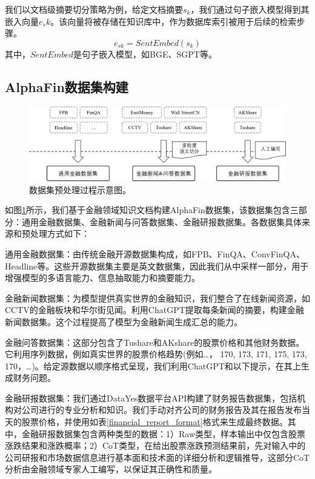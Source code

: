 我们以文档级摘要切分策略为例，给定文档摘要$s_k$，我们通过句子嵌入模型得到其嵌入向量$e_sk$。该向量将被存储在知识库中，作为数据库索引被用于后续的检索步骤。
\begin{equation}
	e_{sk} = SentEmbed(s_k)
\end{equation}
其中，$SentEmbed$是句子嵌入模型，如BGE、SGPT等。

\subsection{AlphaFin数据集构建}

\begin{figure}[htbp]
	\centering
	\includegraphics[scale=0.6]{Fig/dataset_process.png}
	\caption{\label{dataset_process}数据集预处理过程示意图。}
\end{figure}

如图\ref{dataset_process}所示，我们基于金融领域知识文档构建AlphaFin数据集，该数据集包含三部分：通用金融数据集、金融新闻与问答数据集、金融研报数据集。各数据集具体来源和预处理方式如下：

通用金融数据集：由传统金融开源数据集构成，如FPB\cite{DBLP:journals/jasis/MaloSKWT14}、FinQA\cite{DBLP:conf/acl/ZhuLHWZLFC20}、ConvFinQA\cite{DBLP:journals/corr/abs-2310-00566}、Headline\cite{DBLP:journals/corr/abs-2009-04202}等。这些开源数据集主要是英文数据集，因此我们从中采样一部分，用于增强模型的多语言能力、信息抽取能力和摘要能力。

金融新闻数据集：为模型提供真实世界的金融知识，我们整合了在线新闻资源，如CCTV的金融板块和华尔街见闻。利用ChatGPT\cite{DBLP:conf/nips/Ouyang0JAWMZASR22}提取每条新闻的摘要，构建金融新闻数据集。这个过程提高了模型为金融新闻生成汇总的能力。

金融问答数据集：这部分包含了Tushare\cite{tushare}和AKshare\cite{akshare}的股票价格和其他财务数据。它利用序列数据，例如真实世界的股票价格趋势(例如{…， 170, 173, 171, 175, 173, 170，…})。给定源数据以顺序格式呈现，我们利用ChatGPT和以下提示，在其上生成财务问题。

金融研报数据集：我们通过DataYes数据平台API构建了财务报告数据集，包括机构对公司进行的专业分析和知识。我们手动对齐公司的财务报告及其在报告发布当天的股票价格，并使用如表\ref{financial_report_format}格式来生成最终数据。其中，金融研报数据集包含两种类型的数据：1）Raw类型，样本输出中仅包含股票涨跌结果和涨跌概率；2）CoT类型，在给出股票涨跌预测结果前，先对输入中的公司研报和市场数据信息进行基本面和技术面的详细分析和逻辑推导，这部分CoT分析由金融领域专家人工编写，以保证其正确性和质量。

